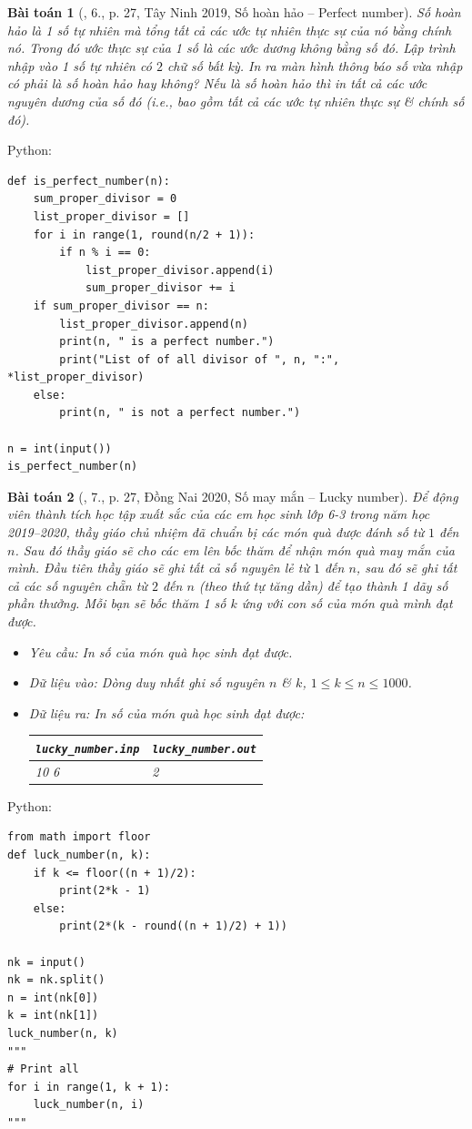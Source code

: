 \documentclass{article}
\newtheorem{baitoan}{Bài toán}
\begin{document}
\begin{baitoan}[\cite{VietSTEM2021}, 6., p. 27, Tây Ninh 2019, Số hoàn hảo -- Perfect number]
	\emph{Số hoàn hảo} là 1 số tự nhiên mà tổng tất cả các ước tự nhiên thực sự của nó bằng chính nó. Trong đó ước thực sự của 1 số là các ước dương không bằng số đó. Lập trình nhập vào 1 số tự nhiên có $2$ chữ số bất kỳ. In ra màn hình thông báo số vừa nhập có phải là số hoàn hảo hay không? Nếu là số hoàn hảo thì in tất cả các ước nguyên dương của số đó (i.e., bao gồm tất cả các ước tự nhiên thực sự \& chính số đó).
\end{baitoan}
Python:
\begin{verbatim}
def is_perfect_number(n):
    sum_proper_divisor = 0
    list_proper_divisor = []
    for i in range(1, round(n/2 + 1)):
        if n % i == 0:
            list_proper_divisor.append(i)
            sum_proper_divisor += i
    if sum_proper_divisor == n:
        list_proper_divisor.append(n)
        print(n, " is a perfect number.")
        print("List of of all divisor of ", n, ":", *list_proper_divisor)
    else:
        print(n, " is not a perfect number.")

n = int(input())
is_perfect_number(n)
\end{verbatim}

\begin{baitoan}[\cite{VietSTEM2021}, 7., p. 27, Đồng Nai 2020, Số may mắn -- Lucky number]
	Để động viên thành tích học tập xuất sắc của các em học sinh lớp 6-3 trong năm học 2019--2020, thầy giáo chủ nhiệm đã chuẩn bị các món quà được đánh số từ $1$ đến $n$. Sau đó thầy giáo sẽ cho các em lên bốc thăm để nhận món quà may mắn của mình. Đầu tiên thầy giáo sẽ ghi tất cả số nguyên lẻ từ $1$ đến $n$, sau đó sẽ ghi tất cả các số nguyên chẵn từ $2$ đến $n$ (theo thứ tự tăng dần) để tạo thành 1 dãy số phần thưởng. Mỗi bạn sẽ bốc thăm 1 số $k$ ứng với con số của món quà mình đạt được.
	\begin{itemize}
		\item {\sf Yêu cầu:} In số của món quà học sinh đạt được.
		\item {\sf Dữ liệu vào:} Dòng duy nhất ghi số nguyên $n$ \& $k$, $1\le k\le n\le1000$.
		\item {\sf Dữ liệu ra:} In số của món quà học sinh đạt được:
		\begin{table}[H]
			\centering
			\begin{tabular}{|l|l|}
				\hline
				\verb|lucky_number.inp| & \verb|lucky_number.out| \\
				\hline
				10 6 & 2 \\
				\hline
			\end{tabular}
		\end{table}
	\end{itemize}
\end{baitoan}
Python:
\begin{verbatim}
from math import floor
def luck_number(n, k):
    if k <= floor((n + 1)/2):
        print(2*k - 1)
    else:
        print(2*(k - round((n + 1)/2) + 1))

nk = input()
nk = nk.split()
n = int(nk[0])
k = int(nk[1])
luck_number(n, k)
"""
# Print all
for i in range(1, k + 1):
    luck_number(n, i)
"""
\end{verbatim}
\end{document}
